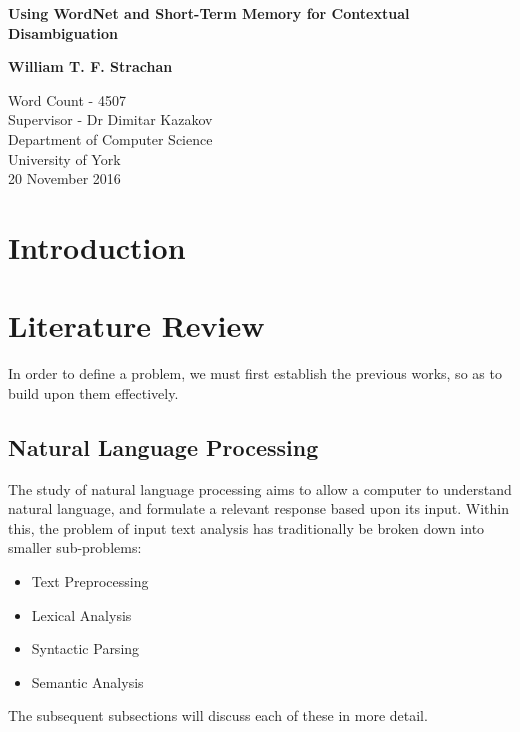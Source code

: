 \documentclass[]{article}
\begin{document}
\begin{titlepage}
    \begin{center}
        \vspace*{1cm}
        
        \Huge
        \textbf{Using WordNet and Short-Term Memory for Contextual Disambiguation}
        \vspace{2cm}
        
        \Large
        \textbf{William T. F. Strachan}
        
        \vfill
                
        \vspace{0.8cm}
        
        \Large
        Word Count - 4507\\
        Supervisor - Dr Dimitar Kazakov\\
        Department of Computer Science\\
        University of York\\
        20 November 2016
        
    \end{center}
\end{titlepage}

\tableofcontents

\newpage

\section{Introduction}
\label{sec:Intro}

\section{Literature Review}
\label{sec:LitReview}
In order to define a problem, we must first establish the previous works, so as to build upon them effectively. 
		

\subsection{Natural Language Processing}
\label{sec:NLP}
The study of natural language processing aims to allow a computer to understand natural language, and formulate a relevant response based upon its input. Within this, the problem of input text analysis has traditionally be broken down into smaller sub-problems\cite{NLPHandbook}:
\begin{itemize}
	\item Text Preprocessing
	\item Lexical Analysis
	\item Syntactic Parsing
	\item Semantic Analysis
\end{itemize}
The subsequent subsections will discuss each of these in more detail.
\end{document}
